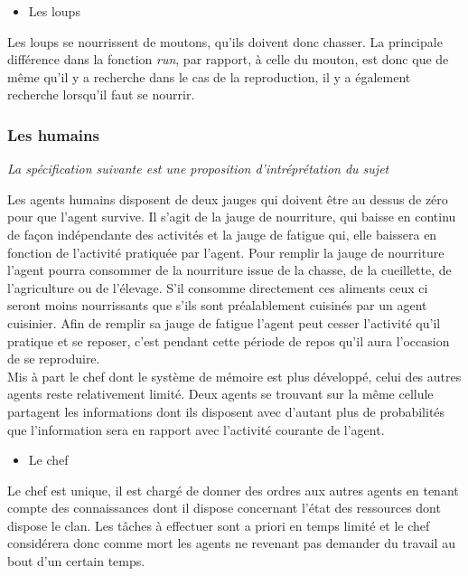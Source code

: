 \documentclass[12pt]{article}
\begin{document}
		\begin{itemize}
		\item Les loups\\
		\end{itemize}

Les loups se nourrissent de moutons, qu'ils doivent donc chasser. La 
principale différence dans la fonction \textit{run}, par rapport, à celle du 
mouton, est donc que de même qu'il y a recherche dans le cas de la 
reproduction, il y a également recherche lorsqu'il faut se nourrir.

		\subsubsection{Les humains}

\textit{La spécification suivante est une proposition d'intréprétation du 
sujet}

Les agents humains disposent de deux jauges qui doivent être au dessus de 
zéro pour que l'agent survive. Il s'agit de la jauge de nourriture, qui baisse 
en continu de façon indépendante des activités et la jauge de fatigue qui, 
elle baissera en fonction de l'activité pratiquée par l'agent. Pour remplir 
la jauge de nourriture l'agent pourra consommer de la nourriture issue de la 
chasse, de la cueillette, de l'agriculture ou de l'élevage. S'il consomme 
directement ces aliments ceux ci seront moins nourrissants que s'ils sont 
préalablement cuisinés par un agent cuisinier. Afin de remplir sa jauge de 
fatigue l'agent peut cesser l'activité qu'il pratique et se reposer, c'est 
pendant cette période de repos qu'il aura l'occasion de se reproduire.\\

Mis à part le chef dont le système de mémoire est plus développé, celui des 
autres agents reste relativement limité. Deux agents se trouvant sur la même 
cellule partagent les informations dont ils disposent avec d'autant plus de 
probabilités que l'information sera en rapport avec l'activité courante de 
l'agent.

		\begin{itemize}
		\item Le chef\\
		\end{itemize}

Le chef est unique, il est chargé de donner des ordres aux autres agents en 
tenant compte des connaissances dont il dispose concernant l'état des 
ressources dont dispose le clan. Les tâches à effectuer sont a priori en temps 
limité et le chef considérera donc comme mort les agents ne revenant pas 
demander du travail au bout d'un certain temps.\\
\end{document}
